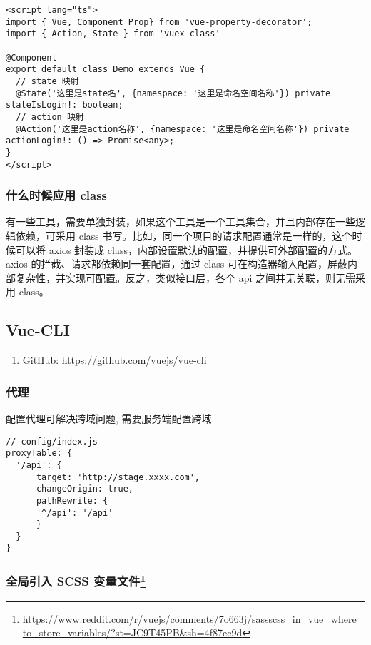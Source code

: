 \begin{lstlisting}
<script lang="ts">
import { Vue, Component Prop} from 'vue-property-decorator';
import { Action, State } from 'vuex-class'

@Component
export default class Demo extends Vue {
  // state 映射
  @State('这里是state名', {namespace: '这里是命名空间名称'}) private stateIsLogin!: boolean;
  // action 映射
  @Action('这里是action名称', {namespace: '这里是命名空间名称'}) private actionLogin!: () => Promise<any>;
}
</script>
\end{lstlisting}

\subsubsection{什么时候应用
class}\label{ux4ec0ux4e48ux65f6ux5019ux5e94ux7528-class}

有一些工具，需要单独封装，如果这个工具是一个工具集合，并且内部存在一些逻辑依赖，可采用
class 书写。比如，同一个项目的请求配置通常是一样的，这个时候可以将 axios
封装成 class，内部设置默认的配置，并提供可外部配置的方式。axios
的拦截、请求都依赖同一套配置，通过 class
可在构造器输入配置，屏蔽内部复杂性，并实现可配置。反之，类似接口层，各个
api 之间并无关联，则无需采用 class。

\subsection{Vue-CLI}\label{vue-cli}

\begin{enumerate}
\def\labelenumi{\arabic{enumi}.}
\tightlist
\item
  GitHub: \url{https://github.com/vuejs/vue-cli}
\end{enumerate}

\subsubsection{代理}\label{ux4ee3ux7406}

配置代理可解决跨域问题, 需要服务端配置跨域.

\begin{lstlisting}
// config/index.js
proxyTable: {
  '/api': {
      target: 'http://stage.xxxx.com',
      changeOrigin: true,
      pathRewrite: {
      '^/api': '/api'
      }
  }
}
\end{lstlisting}

\subsubsection[全局引入 SCSS 变量文件]{\texorpdfstring{全局引入 SCSS
变量文件\footnote{\url{https://www.reddit.com/r/vuejs/comments/7o663j/sassscss_in_vue_where_to_store_variables/?st=JC9T45PB\&sh=4f87ec9d}}}{全局引入 SCSS 变量文件}}\label{ux5168ux5c40ux5f15ux5165-scss-ux53d8ux91cfux6587ux4ef6vueglobalimportvariablesfile}

